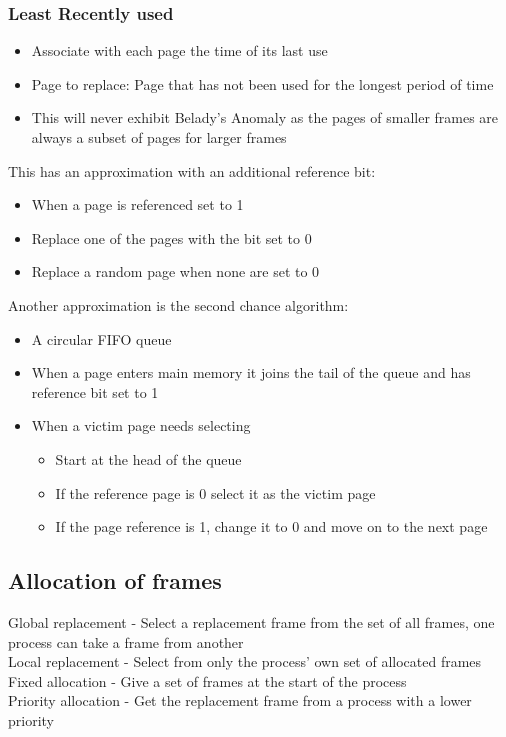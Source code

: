 \documentclass{article}[18pt]
\begin{document}
\subsubsection{Least Recently used}
\begin{itemize}
	\item Associate with each page the time of its last use
	\item Page to replace: Page that has not been used for the longest period of time
	\item This will never exhibit Belady's Anomaly as the pages of smaller frames are always a subset of pages for larger frames
\end{itemize}
This has an approximation with an additional reference bit:
\begin{itemize}
	\item When a page is referenced set to 1
	\item Replace one of the pages with the bit set to 0
	\item Replace a random page when none are set to 0
\end{itemize}
Another approximation is the second chance algorithm:
\begin{itemize}
	\item A circular FIFO queue
	\item When a page enters main memory it joins the tail of the queue and has reference bit set to 1
	\item When a victim page needs selecting
	\begin{itemize}
		\item Start at the head of the queue
		\item If the reference page is 0 select it as the victim page
		\item If the page reference is 1, change it to 0 and move on to the next page
	\end{itemize}
\end{itemize}
\subsection{Allocation of frames}
Global replacement - Select a replacement frame from the set of all frames, one process can take a frame from another\\
Local replacement  - Select from only the process' own set of allocated frames\\
Fixed allocation - Give a set of frames at the start of the process\\
Priority allocation - Get the replacement frame from a process with a lower priority
\end{document}
